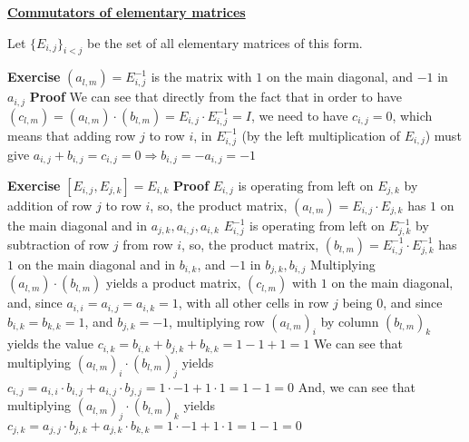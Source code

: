 \documentclass[12pt]{article}
\begin{document}
\newpage
\underline{\textbf{Commutators of elementary matrices}} \newline

Let \( \{ E_{i,j} \}_{i<j} \) be the set of all elementary matrices of this form. \newline

\textbf{Exercise}
\( (a_{l,m})=E_{i,j}^{-1} \) is the matrix with \( 1 \) on the main diagonal, and \( -1 \) in \( a_{i,j} \) \newline
\textbf{Proof}
We can see that directly from the fact that in order to have \newline \( (c_{l,m})=(a_{l,m}) \cdot (b_{l,m})=E_{i,j} \cdot E_{i,j}^{-1}=I \), \newline
we need to have \( c_{i,j}=0 \), which means that adding row \( j \) to row \( i \), in \( E_{i,j}^{-1} \) (by the left multiplication of \( E_{i,j} \)) \newline
must give \( a_{i,j}+b_{i,j}=c_{i,j}=0 \Rightarrow b_{i,j}=-a_{i,j}=-1 \) \newline

\textbf{Exercise}
\( [E_{i,j},E_{j,k}]=E_{i,k} \) \newline
\textbf{Proof}
\( E_{i,j} \) is operating from left on \( E_{j,k} \) by addition of row \( j \) to row \( i \),
so, the product matrix, \( (a_{l,m})=E_{i,j} \cdot E_{j,k} \) has \( 1 \) on the main diagonal and in \( a_{j,k},a_{i,j},a_{i,k} \) \newline
\( E_{i,j}^{-1} \) is operating from left on \( E_{j,k}^{-1} \) by subtraction of row \( j \) from row \( i \),
so, the product matrix, \( (b_{l,m})=E_{i,j}^{-1} \cdot E_{j,k}^{-1} \) has \( 1 \) on the main diagonal and in \( b_{i,k} \), \newline
and \( -1 \) in \( b_{j,k},b_{i,j} \) \newline
Multiplying \( (a_{l,m}) \cdot (b_{l,m}) \) yields a product matrix, \( (c_{l,m}) \) with \( 1 \) on the main diagonal, and, \newline
since \( a_{i,i}=a_{i,j}=a_{i,k}=1 \), with all other cells in row \( j \) being \(0 \),
and since  \( b_{i,k}=b_{k,k}=1 \), and \( b_{j,k}=-1 \), multiplying row \( (a_{l,m})_{i} \) by column \( (b_{l,m})_{k} \) yields
the value \( c_{i,k}=b_{i,k}+b_{j,k}+b_{k,k}=1-1+1=1 \) \newline
We can see that multiplying \( (a_{l,m})_{i} \cdot (b_{l,m})_{j} \)
yields \( c_{i,j}=a_{i,i} \cdot b_{i,j}+a_{i,j} \cdot b_{j,j}=1 \cdot -1+1 \cdot 1=1-1=0 \) \newline
And, we can see that multiplying \( (a_{l,m})_{j} \cdot (b_{l,m})_{k} \)
yields \( c_{j,k}=a_{j,j} \cdot b_{j,k}+a_{j,k} \cdot b_{k,k}=1 \cdot -1+1 \cdot 1=1-1=0 \)
\end{document}
